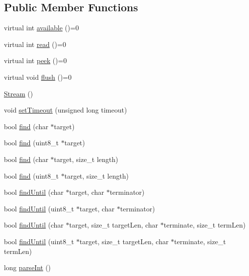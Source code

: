 \subsection*{Public Member Functions}
\begin{DoxyCompactItemize}
\item 
virtual int \hyperlink{class_stream_aebd60457902debb30b07971a16f24ebd}{available} ()=0
\item 
virtual int \hyperlink{class_stream_a4afd50731ba321d1b9be909cb288a50b}{read} ()=0
\item 
virtual int \hyperlink{class_stream_a9ae768d427519818aa552adf467bf65a}{peek} ()=0
\item 
virtual void \hyperlink{class_stream_a50ab71f4bc571f6e246b20db4b3dd131}{flush} ()=0
\item 
\hyperlink{class_stream_a7411b49ed5fda5181dd182d64984906e}{Stream} ()
\item 
void \hyperlink{class_stream_a76c7d6530b9cb17f6663a64aea84b61e}{set\+Timeout} (unsigned long timeout)
\item 
bool \hyperlink{class_stream_a13fd59f691f095fc014b4c012cbd79f7}{find} (char $\ast$target)
\item 
bool \hyperlink{class_stream_a4b392ebdbb1b1eb5fb0b23cb3798ce04}{find} (uint8\+\_\+t $\ast$target)
\item 
bool \hyperlink{class_stream_a064fe7239eb0cc6ba4a41d064d90a51f}{find} (char $\ast$target, size\+\_\+t length)
\item 
bool \hyperlink{class_stream_acf54fbb26d6831374a6667b5a3201f22}{find} (uint8\+\_\+t $\ast$target, size\+\_\+t length)
\item 
bool \hyperlink{class_stream_ae9bf806705b80571316623814e5cb2ca}{find\+Until} (char $\ast$target, char $\ast$terminator)
\item 
bool \hyperlink{class_stream_a2cb0079bcfbffff6273404c8afaa4660}{find\+Until} (uint8\+\_\+t $\ast$target, char $\ast$terminator)
\item 
bool \hyperlink{class_stream_a99d1b6ad00abb9264b5ebb7506585993}{find\+Until} (char $\ast$target, size\+\_\+t target\+Len, char $\ast$terminate, size\+\_\+t term\+Len)
\item 
bool \hyperlink{class_stream_a5a3dbacf38766d57c845d6530f9aa109}{find\+Until} (uint8\+\_\+t $\ast$target, size\+\_\+t target\+Len, char $\ast$terminate, size\+\_\+t term\+Len)
\item 
long \hyperlink{class_stream_a4d54d18e24a5aff0faa15f40be995edf}{parse\+Int} ()
\item 

\end{DoxyCompactItemize}
